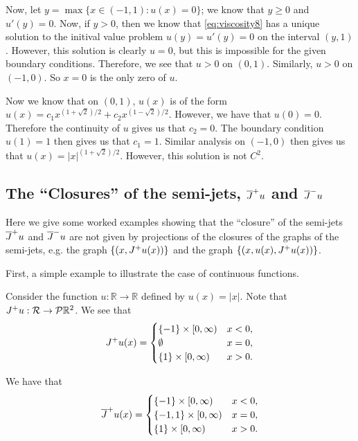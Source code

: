 \begin{example}
Now, let $y = \max \{x\in(-1,1): u(x) = 0\}$; we know that $y\geq 0$ and $u'(y) = 0$. Now, if $y>0$, then we know that \eqref{eq:viscosity8} has a unique solution to the initival value problem $u(y) = u'(y) = 0$ on the interval $(y,1)$. However, this solution is clearly $u = 0$, but this is impossible for the given boundary conditions. Therefore, we see that $u>0$ on $(0,1)$. Similarly, $u>0$ on $(-1,0)$. So $x=0$ is the only zero of $u$.

Now we know that on $(0,1)$, $u(x)$ is of the form $u(x) = c_1 x^{(1+\sqrt{2})/2} + c_2 x^{(1-\sqrt{2})/2}$. However, we have that $u(0) = 0$. Therefore the continuity of $u$ gives us that $c_2 = 0$. The boundary condition $u(1) = 1$ then gives us that $c_1 = 1$. Similar analysis on $(-1,0)$ then gives us that $u(x) = |x|^{(1+\sqrt{2})/2}$. However, this solution is not $C^2$.

\end{example}


\subsection{The ``Closures'' of the semi-jets, $\overline{J}^+ u$ and $\overline{J}^- u$}

Here we give some worked examples showing that the ``closure'' of the semi-jets $\overline{J}^+ u$ and $\overline{J}^- u$ are not given by projections of the closures of the graphs of the semi-jets, e.g. the graph $\{(x,J^+ u(x))\}$ and the graph $\{(x,u(x),J^+ u(x))\}$.

First, a simple example to illustrate the case of continuous functions.

\begin{example}
Consider the function $u: \mathbb R \to \mathbb R$ defined by $u(x) = |x|$. Note that $J^+ u: \mathcal R\to \mathcal{P} \mathbb R^2$. We see that
\begin{equation}
J^+ u(x) = \begin{cases}
\{-1\}\times[0,\infty) & x<0,\\
\emptyset & x=0,\\
\{1\}\times[0,\infty) & x>0.
\end{cases}
\end{equation}

We have that
\begin{equation}
\overline{J}^+ u(x) = \begin{cases}
\{-1\}\times[0,\infty) & x<0,\\
\{-1,1\}\times [0,\infty) & x=0,\\
\{1\}\times[0,\infty) & x>0.
\end{cases}
\end{equation}
\end{example}

